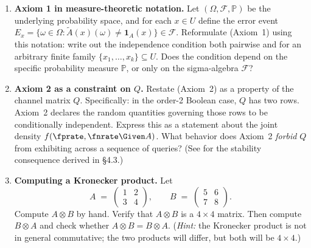 \begin{enumerate}


\item \exstar
\textbf{Axiom 1 in measure-theoretic notation.}
Let $(\Omega, \mathcal{F}, \mathbb{P})$ be the underlying probability space,
and for each $x \in U$ define the error event $E_x = \{\omega \in \Omega :
\tilde{A}(x)(\omega) \neq \mathbf{1}_A(x)\} \in \mathcal{F}$.
Reformulate  (Axiom~1) using this notation: write out
the independence condition both pairwise and for an arbitrary finite family
$\{x_1, \ldots, x_k\} \subseteq U$.
Does the condition depend on the specific probability measure $\mathbb{P}$,
or only on the sigma-algebra $\mathcal{F}$?

\item \exstar
\textbf{Axiom 2 as a constraint on $Q$.}
Restate  (Axiom~2) as a property of the channel
matrix $Q$. Specifically: in the order-2 Boolean case, $Q$ has two rows.
Axiom~2 declares the random quantities governing those rows to be
conditionally independent. Express this as a statement about the joint
density $f(\fprate, \fnrate \Given A)$.
What behavior does Axiom~2 \emph{forbid} $Q$ from exhibiting across a
sequence of queries?
(See  for the stability consequence derived in §4.3.)

\item \exstar
\textbf{Computing a Kronecker product.}
Let
\[
  A \;=\; \begin{pmatrix} 1 & 2 \\ 3 & 4 \end{pmatrix},
  \qquad
  B \;=\; \begin{pmatrix} 5 & 6 \\ 7 & 8 \end{pmatrix}.
\]
Compute $A \otimes B$ by hand. Verify that $A \otimes B$ is a $4 \times 4$
matrix. Then compute $B \otimes A$ and check whether
$A \otimes B = B \otimes A$.
(\textit{Hint:} the Kronecker product is not in general commutative;
the two products will differ, but both will be $4 \times 4$.)



\end{enumerate}
